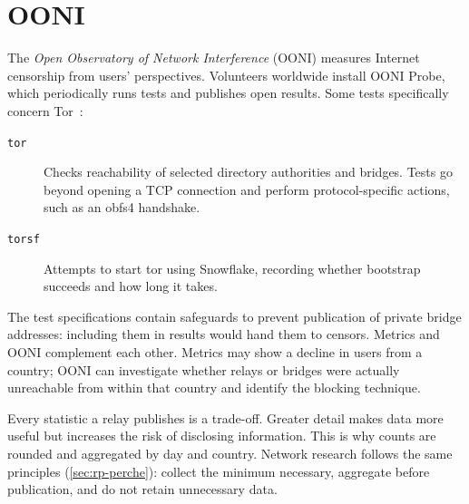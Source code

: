 \section{OONI}\label{sec:metrics-ooni}

The \emph{Open Observatory of Network Interference} (OONI) measures Internet censorship from users' perspectives. Volunteers worldwide install OONI Probe, which periodically runs tests and publishes open results. Some tests specifically concern Tor~\cite{oonitor}:
\begin{description}
  \item[\texttt{tor}] Checks reachability of selected directory authorities and bridges. Tests go beyond opening a TCP connection and perform protocol-specific actions, such as an obfs4 handshake.
  \item[\texttt{torsf}] Attempts to start tor using Snowflake, recording whether bootstrap succeeds and how long it takes.
\end{description}
The test specifications contain safeguards to prevent publication of private bridge addresses: including them in results would hand them to censors. Metrics and OONI complement each other. Metrics may show a decline in users from a country; OONI can investigate whether relays or bridges were actually unreachable from within that country and identify the blocking technique.

\begin{approfondimento}
Every statistic a relay publishes is a trade-off. Greater detail makes data more useful but increases the risk of disclosing information. This is why counts are rounded and aggregated by day and country. Network research follows the same principles (\cref{sec:rp-perche}): collect the minimum necessary, aggregate before publication, and do not retain unnecessary data.
\end{approfondimento}

